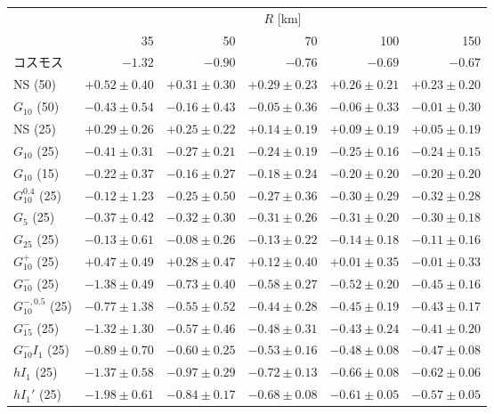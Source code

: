 \begin{tabular}{lrrrrr}
\toprule
& \multicolumn{5}{c}{$R$ [km]} \\
& 35 & 50 & 70 & 100 & 150 \\
\midrule
コスモス & $-1.32$ & $-0.90$ & $-0.76$ & $-0.69$ & $-0.67$ \\
\midrule
NS (50) & $+0.52 \pm 0.40$ & $+0.31 \pm 0.30$ & $+0.29 \pm 0.23$ & $+0.26 \pm 0.21$ & $+0.23 \pm 0.20$ \\
$G_{10}$ (50) & $-0.43 \pm 0.54$ & $-0.16 \pm 0.43$ & $-0.05 \pm 0.36$ & $-0.06 \pm 0.33$ & $-0.01 \pm 0.30$ \\
NS (25) & $+0.29 \pm 0.26$ & $+0.25 \pm 0.22$ & $+0.14 \pm 0.19$ & $+0.09 \pm 0.19$ & $+0.05 \pm 0.19$ \\
$G_{10}$ (25) & $-0.41 \pm 0.31$ & $-0.27 \pm 0.21$ & $-0.24 \pm 0.19$ & $-0.25 \pm 0.16$ & $-0.24 \pm 0.15$ \\
$G_{10}$ (15) & $-0.22 \pm 0.37$ & $-0.16 \pm 0.27$ & $-0.18 \pm 0.24$ & $-0.20 \pm 0.20$ & $-0.20 \pm 0.20$ \\
$G_{10}^{0.4}$ (25) & $-0.12 \pm 1.23$ & $-0.25 \pm 0.50$ & $-0.27 \pm 0.36$ & $-0.30 \pm 0.29$ & $-0.32 \pm 0.28$ \\
$G_{5}$ (25) & $-0.37 \pm 0.42$ & $-0.32 \pm 0.30$ & $-0.31 \pm 0.26$ & $-0.31 \pm 0.20$ & $-0.30 \pm 0.18$ \\
$G_{25}$ (25) & $-0.13 \pm 0.61$ & $-0.08 \pm 0.26$ & $-0.13 \pm 0.22$ & $-0.14 \pm 0.18$ & $-0.11 \pm 0.16$ \\
$G_{10}^{+}$ (25) & $+0.47 \pm 0.49$ & $+0.28 \pm 0.47$ & $+0.12 \pm 0.40$ & $+0.01 \pm 0.35$ & $-0.01 \pm 0.33$ \\
$G_{10}^{-}$ (25) & $-1.38 \pm 0.49$ & $-0.73 \pm 0.40$ & $-0.58 \pm 0.27$ & $-0.52 \pm 0.20$ & $-0.45 \pm 0.16$ \\
$G_{10}^{-,0.5}$ (25) & $-0.77 \pm 1.38$ & $-0.55 \pm 0.52$ & $-0.44 \pm 0.28$ & $-0.45 \pm 0.19$ & $-0.43 \pm 0.17$ \\
$G_{15}^{-}$ (25) & $-1.32 \pm 1.30$ & $-0.57 \pm 0.46$ & $-0.48 \pm 0.31$ & $-0.43 \pm 0.24$ & $-0.41 \pm 0.20$ \\
$G_{10}^{-}I_{1}$ (25) & $-0.89 \pm 0.70$ & $-0.60 \pm 0.25$ & $-0.53 \pm 0.16$ & $-0.48 \pm 0.08$ & $-0.47 \pm 0.08$ \\
$hI_{1}$ (25) & $-1.37 \pm 0.58$ & $-0.97 \pm 0.29$ & $-0.72 \pm 0.13$ & $-0.66 \pm 0.08$ & $-0.62 \pm 0.06$ \\
$hI_{1}'$ (25) & $-1.98 \pm 0.61$ & $-0.84 \pm 0.17$ & $-0.68 \pm 0.08$ & $-0.61 \pm 0.05$ & $-0.57 \pm 0.05$ \\
\bottomrule
\end{tabular}
